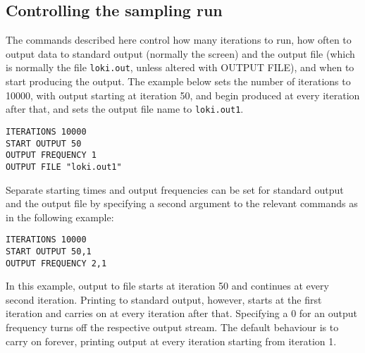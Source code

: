 \documentclass[10pt,a4paper]{article}
\begin{document}
\subsection{Controlling the sampling run}\label{control_run}
The commands described here control how many iterations to run, how often to
output data to standard output (normally the screen) and the output file
(which is normally the file \verb+loki.out+, unless altered with OUTPUT
FILE), and when to start producing the output.  The example below sets the
number of iterations to 10000, with output starting at iteration 50, and
begin produced at every iteration after that, and sets the output file name
to \verb+loki.out1+.
\begin{verbatim}
ITERATIONS 10000
START OUTPUT 50
OUTPUT FREQUENCY 1
OUTPUT FILE "loki.out1"
\end{verbatim}
Separate starting times and output frequencies can be set for
standard output and the output file by specifying a second argument to
the relevant commands as in the following example:
\begin{verbatim}
ITERATIONS 10000
START OUTPUT 50,1
OUTPUT FREQUENCY 2,1
\end{verbatim}
In this example, output to file starts at iteration 50 and continues at
every second iteration.  Printing to standard output, however, starts at the
first iteration and carries on at every iteration after that. Specifying a 0
for an output frequency turns off the respective output stream.  The default
behaviour is to carry on forever, printing output at every iteration
starting from iteration 1.
\end{document}
